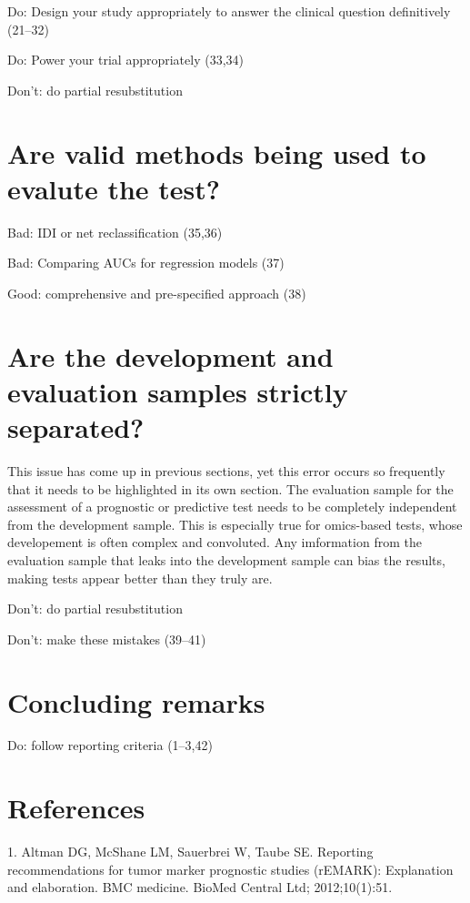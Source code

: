 \documentclass[11pt]{article}
\begin{document}
Do: Design your study appropriately to answer the clinical question
definitively (21--32)

Do: Power your trial appropriately (33,34)

Don't: do partial resubstitution

\section{Are valid methods being used to evalute the
test?}\label{are-valid-methods-being-used-to-evalute-the-test}

Bad: IDI or net reclassification (35,36)

Bad: Comparing AUCs for regression models (37)

Good: comprehensive and pre-specified approach (38)

\section{Are the development and evaluation samples strictly
separated?}\label{are-the-development-and-evaluation-samples-strictly-separated}

This issue has come up in previous sections, yet this error occurs so
frequently that it needs to be highlighted in its own section. The
evaluation sample for the assessment of a prognostic or predictive test
needs to be completely independent from the development sample. This is
especially true for omics-based tests, whose developement is often
complex and convoluted. Any imformation from the evaluation sample that
leaks into the development sample can bias the results, making tests
appear better than they truly are.

Don't: do partial resubstitution

Don't: make these mistakes (39--41)

\section{Concluding remarks}\label{concluding-remarks}

Do: follow reporting criteria (1--3,42)

\section{References}\label{references}

\setlength{\parindent}{0pt}

1. Altman DG, McShane LM, Sauerbrei W, Taube SE. Reporting
recommendations for tumor marker prognostic studies (rEMARK):
Explanation and elaboration. BMC medicine. BioMed Central Ltd;
2012;10(1):51.
\end{document}
